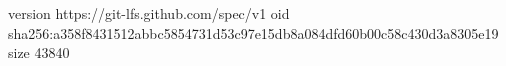 version https://git-lfs.github.com/spec/v1
oid sha256:a358f8431512abbc5854731d53c97e15db8a084dfd60b00c58c430d3a8305e19
size 43840
